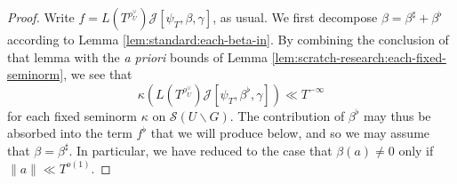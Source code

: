 \begin{proof}
  Write $f = L(T^{\rho_U^\vee }) \mathcal{J}[\psi_T, \beta, \gamma]$, as usual.  We first decompose $\beta = \beta^\sharp + \beta^\flat$ according to Lemma \ref{lem:standard:each-beta-in}.  By combining the conclusion of that lemma with the \emph{a priori} bounds of Lemma \ref{lem:scratch-research:each-fixed-seminorm}, we see that
  \begin{equation*}
    \kappa(L(T^{\rho_U^\vee}) \mathcal{J}[\psi_T,\beta^\flat,\gamma]) \ll T^{-\infty}
  \end{equation*}
  for each fixed seminorm $\kappa$ on $\mathcal{S}(U \backslash G)$.  The contribution of $\beta^{\flat}$ may thus be absorbed into the term $f^{\flat}$ that we will produce below, and so we may assume that $\beta = \beta^\sharp$.  In particular, we have reduced to the case that $\beta(a) \neq 0$ only if $\|a\| \ll T^{o(1)}$.


\end{proof}
